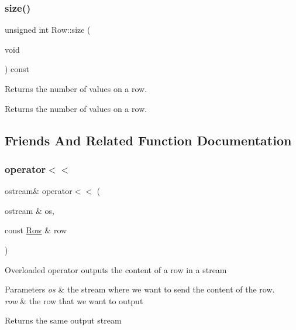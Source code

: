 \subsubsection{\texorpdfstring{size()}{size()}}
{\footnotesize\ttfamily unsigned int Row\+::size (\begin{DoxyParamCaption}\item[{void}]{ }\end{DoxyParamCaption}) const}

Returns the number of values on a row. \begin{DoxyReturn}{Returns}
the number of values on a row. 
\end{DoxyReturn}


\subsection{Friends And Related Function Documentation}
\mbox{\label{class_row_a8962fdc6373687757234a811e803a1da}} 
\subsubsection{\texorpdfstring{operator$<$$<$}{operator<<}\hspace{0.1cm}{\footnotesize\ttfamily [1/2]}}
{\footnotesize\ttfamily ostream\& operator$<$$<$ (\begin{DoxyParamCaption}\item[{ostream \&}]{os,  }\item[{const \hyperlink{class_row}{Row} \&}]{row }\end{DoxyParamCaption})\hspace{0.3cm}{\ttfamily [friend]}}

Overloaded operator outputs the content of a row in a stream 
\begin{DoxyParams}{Parameters}
{\em os} & the stream where we want to send the content of the row. \\
\hline
{\em row} & the row that we want to output \\
\hline
\end{DoxyParams}
\begin{DoxyReturn}{Returns}
the same output stream 
\end{DoxyReturn}
\mbox{\label{class_row_ad4e8b6c4b0238a50bde8e99ec8a0dcb0}} 
